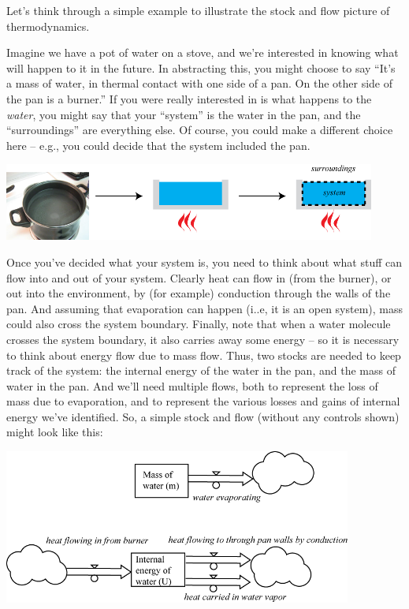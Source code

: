 \documentclass[10pt]{book}
\newcommand{\beforefig}{\vspace{0.2in}}
\newcommand{\afterfig}{\vspace{0.2in}}
\begin{document}
Let's think through a simple example to illustrate the stock and flow picture of thermodynamics.

Imagine we have a pot of water on a stove, and we're interested in knowing what will happen to it in the future.  In abstracting this, you might choose to say ``It's a mass of water, in thermal contact with one side of a pan.  On the other side of the pan is a burner.''  If you were really interested in is what happens to the {\em water}, you might say that your ``system''  is the water in the pan, and the ``surroundings'' are everything else.  Of course, you could make a different choice here -- e.g., you could decide that the system included the pan.  

\beforefig
 \centerline{\includegraphics[height=1in]{figs/ThermalSystemAbstraction.png}}
\afterfig

Once you've decided what your system is, you need to think about what stuff can flow into and out of your system.  Clearly heat can flow in (from the burner), or out into the environment, by (for example) conduction through the walls of the pan.  And assuming that evaporation can happen (i..e, it is an open system), mass could also cross the system boundary.  Finally, note that when a water molecule crosses the system boundary, it also carries away some energy -- so it is necessary to think about energy flow due to mass flow.  Thus, two stocks are needed to keep track of the system: the internal energy of the water in the pan, and the mass of water in the pan.  And we'll need multiple flows, both to represent the loss of mass due to evaporation, and to represent the various losses and gains of internal energy we've identified.  So, a simple stock and flow (without any controls shown) might look like this:

\beforefig
 \centerline{\includegraphics[height=2in]{figs/WaterInPanSimple}}
\afterfig
\end{document}
